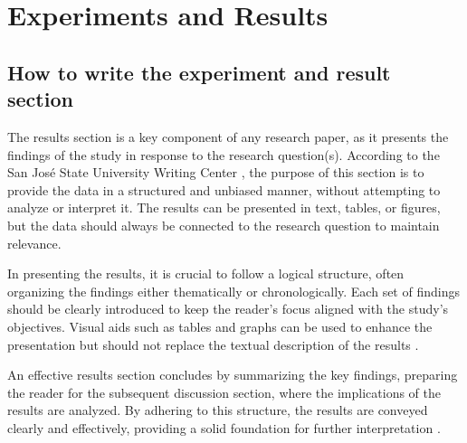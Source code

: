 

\setcounter{chapter}{3}
\chapter{Experiments and Results} \label{chap::experimentsResult}
\section{How to write the experiment and result section}
The results section is a key component of any research paper, as it presents the findings of the study in response to the research question(s). According to the San José State University Writing Center \cite{SJSUWritingCenterResults}, the purpose of this section is to provide the data in a structured and unbiased manner, without attempting to analyze or interpret it. The results can be presented in text, tables, or figures, but the data should always be connected to the research question to maintain relevance.

In presenting the results, it is crucial to follow a logical structure, often organizing the findings either thematically or chronologically. Each set of findings should be clearly introduced to keep the reader’s focus aligned with the study's objectives. Visual aids such as tables and graphs can be used to enhance the presentation but should not replace the textual description of the results \cite{SJSUWritingCenterResults}. 

An effective results section concludes by summarizing the key findings, preparing the reader for the subsequent discussion section, where the implications of the results are analyzed. By adhering to this structure, the results are conveyed clearly and effectively, providing a solid foundation for further interpretation \cite{SJSUWritingCenterResults}.
